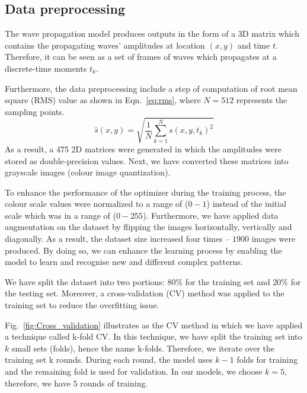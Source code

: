 \subsection{Data preprocessing}
The wave propagation model produces outputs in the form of a 3D matrix which contains the propagating waves' amplitudes at location \((x, y)\) and time \(t\). 
Therefore, it can be seen as a set of frames of waves which propagates at a discrete-time moments \(t_k\).

Furthermore, the data preprocessing include a step of computation of root mean square (RMS) value as shown in Eqn.~\ref{eq:rms}, where \(N=512\) represents the sampling points.
\begin{equation}
	\hat{s}(x,y) = \sqrt{\frac{1}{N}\sum_{k=1}^{N} s(x,y,t_k)^2}
	\label{eq:rms}
\end{equation}
As a result, a 475 2D matrices were generated in which the amplitudes were stored as double-precision values.
Next, we have converted these matrices into grayscale images (colour image quantization).

To enhance the performance of the optimizer during the training process, the colour scale values were normalized to a range of (\(0-1\)) instead of the initial scale which was in a range of (\(0 - 255\)).	
Furthermore, we have applied data augmentation on the dataset by flipping the images horizontally, vertically and diagonally. 
As a result, the dataset size increased four times -- \(1900\)  images were produced.
By doing so, we can enhance the learning process by enabling the model to learn and recognise new and different complex patterns.

We have split the dataset into two portions:  \(80\%\) for the training set and \(20\%\) for the testing set.
Moreover, a cross-validation (CV) method was applied to the training set to reduce the overfitting issue. 

Fig.~\ref{fig:Cross_validation} illustrates as the CV method in which  we have applied a technique called k-fold CV.
In this technique, we have split the training set into \(k\) small sets (folds), hence the name k-folds. 
Therefore, we iterate over the training set k rounds.
During each round, the model uses  \(k-1\) folds for training and the remaining fold is used for validation. 
In our models, we choose \(k=5\), therefore, we have \(5\) rounds of training. 

